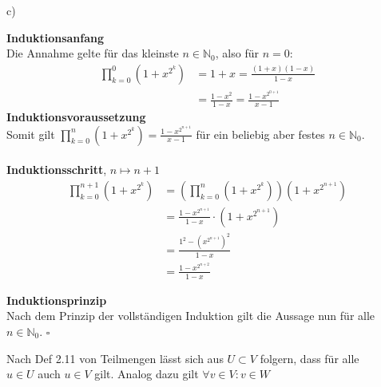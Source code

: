 \documentclass[a4paper,graphics,11pt]{article}
\begin{document}
c)

\begin{minipage}{0.05\linewidth}
    \qquad
\end{minipage}
\begin{minipage}{1\linewidth}
        \textbf{Induktionsanfang}\\
        Die Annahme gelte für das kleinste $n\in \mathbb{N}_{0}$, also für $n=0$:
        \begin{align*}
            \prod_{k=0}^{0}\left(1+x^{2^{k}}\right)
            &= 1+x = \frac{(1+x)(1-x)}{1-x} \\[1em]
            &= \frac{1-x^2}{1-x} = \frac{1-x^{2^{0+1}}}{x-1}
        \end{align*}
        \textbf{Induktionsvoraussetzung}\\[.5em]
        Somit gilt $\displaystyle \prod_{k=0}^{n} (1+x^{2^k}) = \frac{1-x^{2^{n+1}}}{x-1}$ für ein beliebig aber festes $n \in \mathbb{N}_0$.\\\\
        \textbf{Induktionsschritt}, $n \mapsto n+1$ \\
        \begin{align*}
            \prod_{k=0}^{n+1}\left(1+x^{2^k}\right)
            &= \left(\prod_{k=0}^{n}\left(1+x^{2^k}\right)\right) \left(1+x^{2^{n+1}}\right)\\[1em]
            &= \frac{1-x^{2^{n+1}}}{1-x} \cdot \left(1+x^{2^{n+1}}\right)\\[1em]
            &= \frac{1^2-\left(x^{2^{n+1}}\right)^2}{1-x}\\[1em]
            &= \frac{1-x^{2^{n+2}}}{1-x}
        \end{align*}

        \textbf{Induktionsprinzip}\\
        Nach dem Prinzip der vollständigen Induktion gilt die Aussage nun für alle
        $n \in \mathbb{N}_0$. \hfill$\square$
\end{minipage}

\newpage

Nach Def 2.11 von Teilmengen lässt sich aus $U \subset V$ folgern, dass für alle\\
$u \in U$ auch $u \in V$  gilt. Analog dazu gilt $\forall v \in V \colon v \in W$
\end{document}
